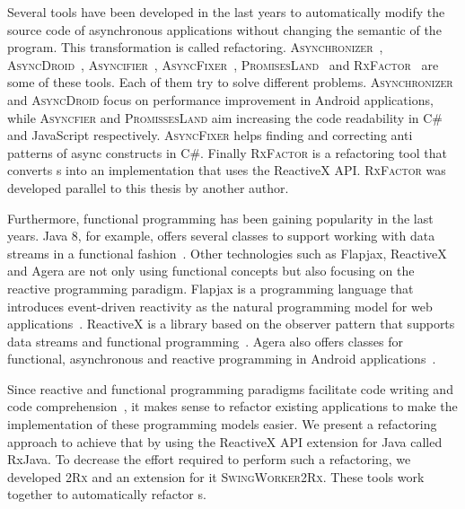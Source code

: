 \documentclass[type=bsc,accentcolor=tud9c]{tudthesis}
\newcommand{\framework}[1]{\textcolor{black!65}{#1}}
\newcommand{\toolcore}{\textsc{2Rx}}
\newcommand{\toolextension}{\textsc{SwingWorker2Rx}}
\begin{document}
Several tools have been developed in the last years to automatically modify the source code of asynchronous applications without changing the semantic of the program. This transformation is called refactoring. \textsc{Asynchronizer}~\cite{paperRetrofittingConcurrency}, \textsc{AsyncDroid}~\cite{paperStudyRefactoring}, \textsc{Asyncifier}~\cite{paperAsyncMobile}, \textsc{AsyncFixer}~\cite{paperAsyncMobile}, \textsc{PromisesLand}~\cite{thesisJavaScript} and \textsc{RxFactor}~\cite{thesisRxFactor} are some of these tools. Each of them try to solve different problems. \textsc{Asynchronizer} and \textsc{AsyncDroid} focus on performance improvement in \framework{Android} applications, while \textsc{Asyncfier} and \textsc{PromissesLand} aim increasing the code readability in \framework{C\#} and \framework{JavaScript} respectively. \textsc{AsyncFixer} helps finding and correcting anti patterns of async constructs in \framework{C\#}. Finally \textsc{RxFactor} is a refactoring tool that converts s into an implementation that uses the \framework{ReactiveX} API. \textsc{RxFactor} was developed parallel to this thesis by another author.

Furthermore, functional programming has been gaining popularity in the last years. \framework{Java 8}, for example, offers several classes to support working with data streams in a functional fashion~\cite{bookJava8Streams}. Other technologies such as \framework{Flapjax}, \framework{ReactiveX} and \framework{Agera} are not only using functional concepts but also focusing on the reactive programming paradigm. \framework{Flapjax} is a programming language that introduces event-driven reactivity as the natural programming model for web applications~\cite{paperFlapjax}. \framework{ReactiveX} is a library based on the observer pattern that supports data streams and functional programming~\cite{reactiveX}. \framework{Agera} also offers classes for functional, asynchronous and reactive programming in \framework{Android} applications~\cite{agera}.

Since reactive and functional programming paradigms facilitate code writing and code comprehension~\cite{promises, paperReactiveComprehension}, it makes sense to refactor existing applications to make the implementation of these programming models easier. We present a refactoring approach to achieve that by using the \framework{ReactiveX} API extension for \framework{Java} called \framework{RxJava}. To decrease the effort required to perform such a refactoring, we developed \toolcore{} and an extension for it \toolextension{}. These tools work together to automatically refactor s.
\end{document}
